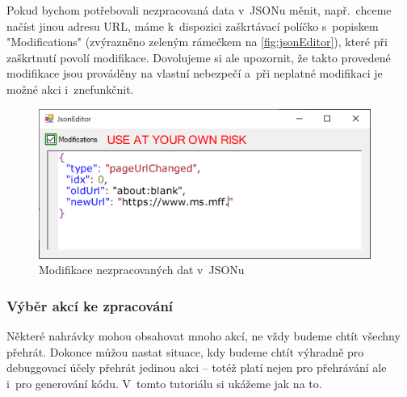 \documentclass[12pt, a4paper, twoside]{article}
\begin{document}
	\newpage
	Pokud bychom potřebovali nezpracovaná data v~JSONu měnit, např.~chceme načíst jinou adresu URL, máme k~dispozici zaškrtávací políčko s~popiskem "Modifications" (zvýrazněno zeleným rámečkem na \cref{fig:jsonEditor}), které při zaškrtnutí povolí modifikace. Dovolujeme si ale upozornit, že takto provedené modifikace jsou prováděny na vlastní nebezpečí a~při neplatné modifikaci je možné akci i~znefunkčnit.
	\begin{figure}[H]
		\centering
		\includegraphics[width=0.97\textwidth]{jsonModificationInProgress.png}
		\caption{Modifikace nezpracovaných dat v~JSONu}
	\end{figure}
	\subsubsection{Výběr akcí ke zpracování}
	Některé nahrávky mohou obsahovat mnoho akcí, ne vždy budeme chtít všechny přehrát. Dokonce můžou nastat situace, kdy budeme chtít výhradně pro debuggovací účely přehrát jedinou akci -- totéž platí nejen pro přehrávání ale i~pro generování kódu. V~tomto tutoriálu si ukážeme jak na to.
	
\end{document}

